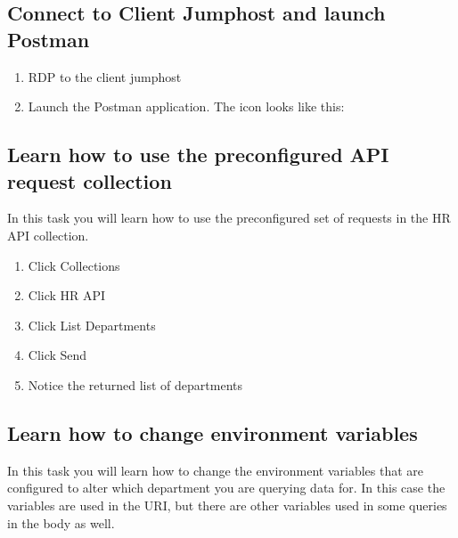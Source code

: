 \documentclass[letterpaper,10pt,english]{sphinxmanual}
\begin{document}
\subsection{Connect to Client Jumphost and launch Postman}
\label{\detokenize{class1/module1/module1:connect-to-client-jumphost-and-launch-postman}}\begin{enumerate}
\item {} 
RDP to the client jumphost

\item {} 
Launch the Postman application. The icon looks like this:

\end{enumerate}
\begin{quote}

\noindent{}
\end{quote}


\subsection{Learn how to use the preconfigured API request collection}
\label{\detokenize{class1/module1/module1:learn-how-to-use-the-preconfigured-api-request-collection}}
In this task you will learn how to use the preconfigured set of requests
in the HR API collection.
\begin{enumerate}
\item {} 
Click Collections

\item {} 
Click HR API

\item {} 
Click List Departments

\item {} 
Click Send

\item {} 
Notice the returned list of departments

\end{enumerate}
\begin{quote}

\noindent{}
\end{quote}


\subsection{Learn how to change environment variables}
\label{\detokenize{class1/module1/module1:learn-how-to-change-environment-variables}}
In this task you will learn how to change the environment variables that
are configured to alter which department you are querying data for. In
this case the variables are used in the URI, but there are other
variables used in some queries in the body as well.
\end{document}

